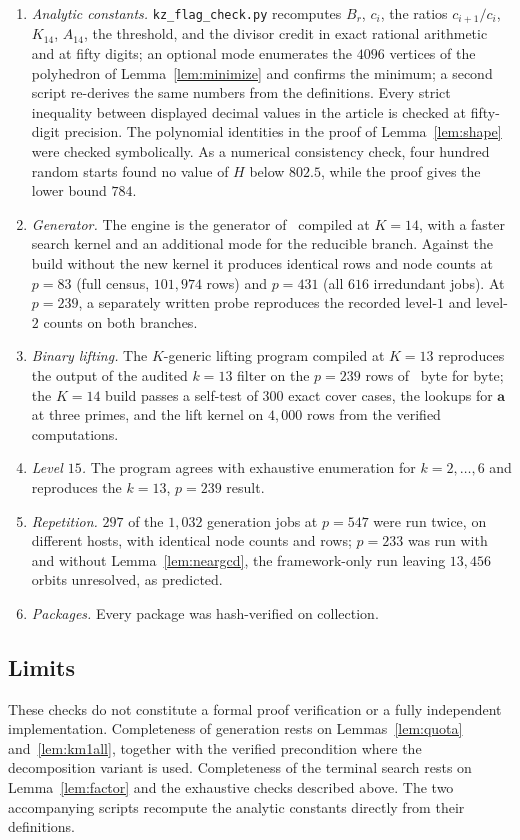 \documentclass[11pt]{article}
\theoremstyle{definition}
\theoremstyle{remark}
\newcommand{\vct}[1]{\mathbf{#1}}
\begin{document}
\begin{enumerate}[leftmargin=*,label=(\roman*)]
\item \emph{Analytic constants.}  \texttt{kz\_flag\_check.py} recomputes
  $B_r$, $c_i$, the ratios $c_{i+1}/c_i$, $K_{14}$, $A_{14}$, the
  threshold, and the divisor credit in exact rational arithmetic and at
  fifty digits; an optional mode enumerates the $4096$ vertices of the
  polyhedron of Lemma~\ref{lem:minimize} and confirms the minimum; a
  second script re-derives the same numbers from the definitions.  Every
  strict inequality between displayed decimal values in the article is
  checked at fifty-digit precision.  The
  polynomial identities in the proof of Lemma~\ref{lem:shape} were checked
  symbolically.  As a numerical consistency check, four hundred random
  starts found no value of $H$ below $802.5$, while the proof gives the
  lower bound $784$.
\item \emph{Generator.}  The engine is the generator of~\cite{Allikvere26}
  compiled at $K=14$, with a faster search kernel and an additional mode
  for the reducible branch.  Against the build without the new kernel it produces
  identical rows and node counts at $p=83$ (full census, $101{,}974$ rows)
  and $p=431$ (all $616$ irredundant jobs).
  At $p=239$, a separately written probe reproduces the recorded level-$1$
  and level-$2$ counts on both branches.
\item \emph{Binary lifting.}  The $K$-generic lifting program compiled at $K=13$
  reproduces the output of the audited $k=13$ filter on the $p=239$ rows
  of~\cite{Allikvere26} byte for byte; the $K=14$ build passes a self-test
  of $300$ exact cover cases, the lookups for $\vct{a}$ at three primes,
  and the lift kernel on $4{,}000$ rows from the verified computations.
\item \emph{Level $15$.}  The program agrees with exhaustive enumeration
  for $k=2,\ldots,6$ and reproduces the $k=13$, $p=239$ result.
\item \emph{Repetition.}  $297$ of the $1{,}032$ generation jobs at
  $p=547$ were run twice, on different hosts, with identical node counts
  and rows; $p=233$ was run
  with and without Lemma~\ref{lem:neargcd}, the framework-only run leaving
  $13{,}456$ orbits unresolved, as predicted.
\item \emph{Packages.}  Every package was hash-verified on collection.
\end{enumerate}

\subsection{Limits}
These checks do not constitute a formal proof verification or a fully
independent implementation.  Completeness of generation rests on
Lemmas~\ref{lem:quota} and~\ref{lem:km1all}, together with the verified
precondition where the decomposition variant is used.  Completeness of
the terminal search rests on Lemma~\ref{lem:factor} and the exhaustive
checks described above.  The two accompanying scripts recompute the
analytic constants directly from their definitions.
\end{document}
